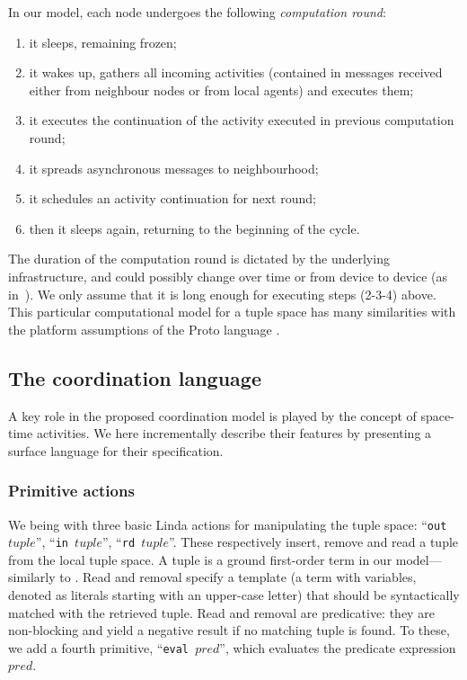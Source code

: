 \documentclass[12pt,a4paper,twoside,openright]{book}
\begin{document}
In our model, each node undergoes the following \emph{computation round}:
\begin{enumerate}
 \item it sleeps, remaining frozen;
 \item it wakes up, gathers all incoming activities (contained in messages received either from neighbour nodes or from local agents) and executes them;
 \item it executes the continuation of the activity executed in previous computation round;
 \item it spreads asynchronous messages to neighbourhood;
 \item it schedules an activity continuation for next round;
 \item then it sleeps again, returning to the beginning of the cycle.
\end{enumerate}
%
The duration of the computation round is dictated by the underlying infrastructure, and could possibly change over time or from device to device (as in~\cite{ProtoTime}).
%
We only assume that it is long enough for executing steps (2-3-4) above.
%
This particular computational model for a tuple space has many similarities with the platform assumptions of the Proto language \cite{proto,spatialcomputing-sac11}.

\subsection{The coordination language}

A key role in the proposed coordination model is played by the concept of space-time activities.
%
We here incrementally describe their features by presenting a surface language for their specification.

\subsubsection*{Primitive actions}

We being with three basic Linda actions for manipulating the tuple space: ``\texttt{out $tuple$}'', ``\texttt{in $tuple$}'', ``\texttt{rd $tuple$}''. 
%
These respectively insert, remove and read a tuple from the local tuple space.
%
A tuple is a ground first-order term in our model---similarly to \cite{tucson-aamas99}.
%
Read and removal specify a template (a term with variables, denoted as literals starting with an upper-case letter) that should be syntactically matched with the retrieved tuple. 
%
Read and removal are predicative: they are non-blocking and yield a negative result if no matching tuple is found. 
%
To these, we add a fourth primitive, ``\texttt{eval $pred$}'', which evaluates the predicate expression $pred$.
\end{document}
